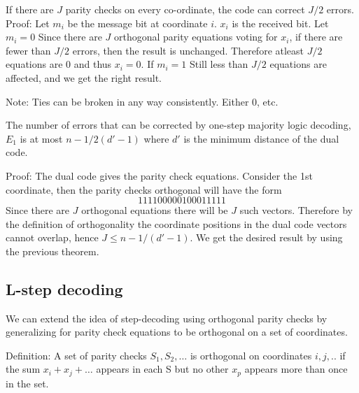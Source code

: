 \begin{Theorem} 
If there are $J$ parity checks on every co-ordinate, the code can correct $J/2$ errors.
Proof: 
Let $m_i$ be the message bit at coordinate $i$. $x_i$ is the received bit. 
Let $m_i=0$
Since there are $J$ orthogonal parity equations voting for $x_i$, if there are fewer than $J/2$ errors, then the result is unchanged. Therefore atleast $J/2$ equations are $0$ and thus $x_i=0$.
If $m_i=1$
Still less than $J/2$ equations are affected, and we get the right result.
\end{Theorem}

Note: Ties can be broken in any way consistently. Either $0$, etc.

\begin{Theorem}
The number of errors that can be corrected by one-step majority logic decoding, $E_1$ is at most $n-1/2(d'-1)$ where $d'$ is the minimum distance of the dual code.

Proof: The dual code gives the parity check equations. 
Consider the 1st coordinate, then the parity checks orthogonal will have the form
\begin{equation*}
1  1 1 1  0 0 0 0 0
1  0 0 0  1 1 1 1 1 
\end{equation*}
Since there are $J$ orthogonal equations there will be $J$ such vectors.
Therefore by the definition of orthogonality the coordinate positions in the dual code vectors cannot overlap, hence $J \leq n-1/(d'-1) $.
We get the desired result by using the previous theorem.
\end{Theorem}

\subsection{L-step decoding}
We can extend the idea of step-decoding using orthogonal parity checks by generalizing for parity check equations to be orthogonal on a set of coordinates. 

Definition: A set of parity checks $S_1, S_2,\ldots$ is orthogonal on coordinates $i,j,..$ if the sum $x_i+x_j+\ldots$ appears in each S but no other $x_p$ appears more than once in the set.


